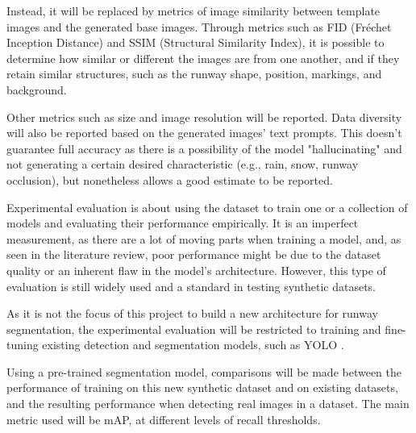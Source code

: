 Instead, it will be replaced by metrics of image similarity between template
images and the generated base images. Through metrics such as FID (Fréchet
Inception Distance) and SSIM (Structural Similarity Index), it is possible to
determine how similar or different the images are from one another, and if they
retain similar structures, such as the runway shape, position, markings, and background.

Other metrics such as size and image resolution will be reported. Data diversity will also be reported based on the generated images' text prompts. This doesn't guarantee full accuracy as there is a possibility of the model "hallucinating" and not generating a certain desired characteristic (e.g., rain, snow, runway occlusion), but nonetheless allows a good estimate to be reported.

Experimental evaluation is about using the dataset to train one or a collection of models and evaluating their performance empirically. It is an imperfect measurement, as there are a lot of moving parts when training a model, and, as seen in the literature review, poor performance might be due to the dataset quality or an inherent flaw in the model's architecture. However, this type of evaluation is still widely used and a standard in testing synthetic datasets.

As it is not the focus of this project to build a new architecture for runway
segmentation, the experimental evaluation will be restricted to training and
fine-tuning existing detection and segmentation models, such as YOLO
\cite{jocher_ultralytics_2023}.

Using a pre-trained segmentation model, comparisons will be made between the
performance of training on this new synthetic dataset and on existing datasets,
and the resulting performance when detecting real images in a dataset. The main
metric used will be \ac{mAP}, at different levels of recall thresholds.
